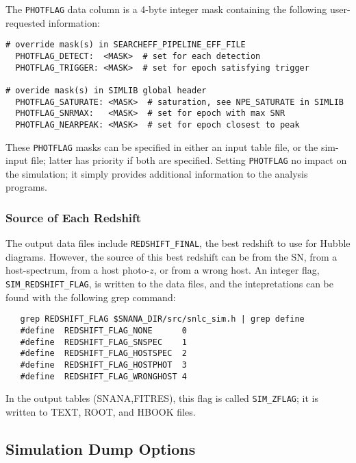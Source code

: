 \documentclass[12pt]{article}
\begin{document}
The {\tt PHOTFLAG} data column is a 4-byte integer mask containing
the following user-requested information:
%
\begin{verbatim}
# override mask(s) in SEARCHEFF_PIPELINE_EFF_FILE
  PHOTFLAG_DETECT:  <MASK>  # set for each detection
  PHOTFLAG_TRIGGER: <MASK>  # set for epoch satisfying trigger

# overide mask(s) in SIMLIB global header
  PHOTFLAG_SATURATE: <MASK>  # saturation, see NPE_SATURATE in SIMLIB
  PHOTFLAG_SNRMAX:   <MASK>  # set for epoch with max SNR
  PHOTFLAG_NEARPEAK: <MASK>  # set for epoch closest to peak 
\end{verbatim}
%
These {\tt PHOTFLAG} masks can be specified in either an input
table file, or the sim-input file; latter has priority if both
are specified. Setting {\tt PHOTFLAG} no impact on the simulation;
it simply provides additional information to the analysis programs.


  \clearpage
   \subsubsection{Source of Each Redshift}
   \label{sss:redshift_flag}

The output data files include {\tt REDSHIFT\_FINAL},
the best redshift to use for Hubble diagrams.
However, the source of this best redshift can be
from the SN, from a host-spectrum, from a host photo-$z$,
or from a wrong host. An integer flag, {\tt SIM\_REDSHIFT\_FLAG},
is written to the data files, and the intepretations can be
found with the following grep command:

\begin{verbatim}
   grep REDSHIFT_FLAG $SNANA_DIR/src/snlc_sim.h | grep define
   #define  REDSHIFT_FLAG_NONE      0
   #define  REDSHIFT_FLAG_SNSPEC    1 
   #define  REDSHIFT_FLAG_HOSTSPEC  2
   #define  REDSHIFT_FLAG_HOSTPHOT  3
   #define  REDSHIFT_FLAG_WRONGHOST 4
\end{verbatim}

In the output tables (SNANA,FITRES), this flag is called {\tt SIM\_ZFLAG};
it is written to TEXT, ROOT, and HBOOK files.


  \clearpage
   \subsection{Simulation Dump Options}
   \label{subsec:dump_options}
\end{document}

